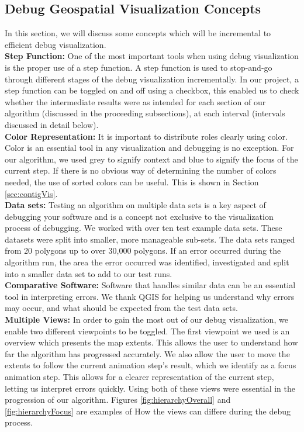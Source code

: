 \subsection{Debug Geospatial Visualization Concepts}
In this section, we will discuss some concepts which will be incremental to efficient debug visualization.
\\ \textbf{Step Function: }One of the most important tools when using debug visualization is the proper use of a step function. A step function is used to stop-and-go through different stages of the debug visualization incrementally. In our project, a step function can be toggled on and off using a checkbox, this enabled us to check whether the intermediate results were as intended for each section of our algorithm (discussed in the proceeding subsections), at each interval (intervals discussed in detail below). 
\\ \textbf{Color Representation: }It is important to distribute roles clearly using color. Color is an essential tool in any visualization and debugging is no exception. For our algorithm, we used grey to signify context and blue to signify the focus of the current step. If there is no obvious way of determining the number of colors needed, the use of sorted colors can be useful. This is shown in Section \ref{sec:contigVis}.
\\ \textbf{Data sets: }Testing an algorithm on multiple data sets is a key aspect of debugging your software and is a concept not exclusive to the visualization process of debugging. We worked with over ten test example data sets. These datasets were split into smaller, more manageable sub-sets. The data sets ranged from 20 polygons up to over 30,000 polygons. If an error occurred during the algorithm run, the area the error occurred was identified, investigated and split into a smaller data set to add to our test runs.
\\ \textbf{Comparative Software: }Software that handles similar data can be an essential tool in interpreting errors. We thank QGIS \cite{qgis2015qgis} for helping us understand why errors may occur, and what should be expected from the test data sets.
\\ \textbf{Multiple Views: }In order to gain the most out of our debug visualization, we enable two different viewpoints to be toggled. The first viewpoint we used is an overview which presents the map extents. This allows the user to understand how far the algorithm has progressed accurately. We also allow the user to move the extents to follow the current animation step's result, which we identify as a focus animation step. This allows for a clearer representation of the current step, letting us interpret errors quickly. Using both of these views were  essential in the progression of our algorithm. Figures \ref{fig:hierarchyOverall} and \ref{fig:hierarchyFocus} are examples of How the views can differe during the debug process.

